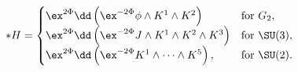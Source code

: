 \begin{equation}
\label{calib2}
   * H = \begin{cases} 
      \ex^{2\Phi} \dd \left( \ex^{-2\Phi}
          \phi \wedge K^1 \wedge K^2 \right) 
             & \text{for $G_2$} , \\ 
      \ex^{2\Phi} \dd \left( \ex^{-2\Phi}
          J\wedge K^1 \wedge K^2 \wedge K^3 \right) 
             & \text{for $\SU(3)$} , \\ 
      \ex^{2\Phi} \dd \left( \ex^{-2\Phi}
          K^1 \wedge \dots \wedge K^5 \right) ,
             & \text{for $\SU(2)$} . \\ 
      \end{cases}
\end{equation}

